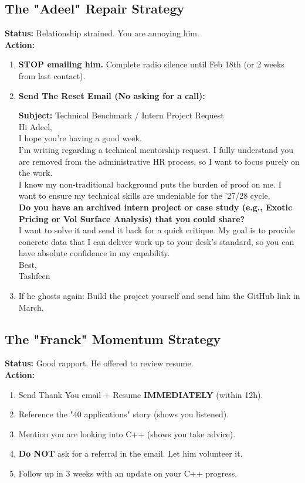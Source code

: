 \documentclass[11pt, a4paper]{article}
\begin{document}
\subsection{The "Adeel" Repair Strategy}
\textbf{Status:} Relationship strained. You are annoying him. \\
\textbf{Action:}
\begin{enumerate}
    \item \textbf{STOP emailing him.} Complete radio silence until Feb 18th (or 2 weeks from last contact).
    \item \textbf{Send The Reset Email (No asking for a call):}
    \begin{tcolorbox}
    \textbf{Subject:} Technical Benchmark / Intern Project Request \\
    Hi Adeel, \\
    I hope you're having a good week. \\
    I’m writing regarding a technical mentorship request. I fully understand you are removed from the administrative HR process, so I want to focus purely on the work. \\
    I know my non-traditional background puts the burden of proof on me. I want to ensure my technical skills are undeniable for the '27/28 cycle. \\
    \textbf{Do you have an archived intern project or case study (e.g., Exotic Pricing or Vol Surface Analysis) that you could share?} \\
    I want to solve it and send it back for a quick critique. My goal is to provide concrete data that I can deliver work up to your desk's standard, so you can have absolute confidence in my capability. \\
    Best, \\
    Tashfeen
    \end{tcolorbox}
    \item If he ghosts again: Build the project yourself and send him the GitHub link in March.
\end{enumerate}

\subsection{The "Franck" Momentum Strategy}
\textbf{Status:} Good rapport. He offered to review resume. \\
\textbf{Action:}
\begin{enumerate}
    \item Send Thank You email + Resume \textbf{IMMEDIATELY} (within 12h).
    \item Reference the "40 applications" story (shows you listened).
    \item Mention you are looking into C++ (shows you take advice).
    \item \textbf{Do NOT} ask for a referral in the email. Let him volunteer it.
    \item Follow up in 3 weeks with an update on your C++ progress.
\end{enumerate}
\end{document}
